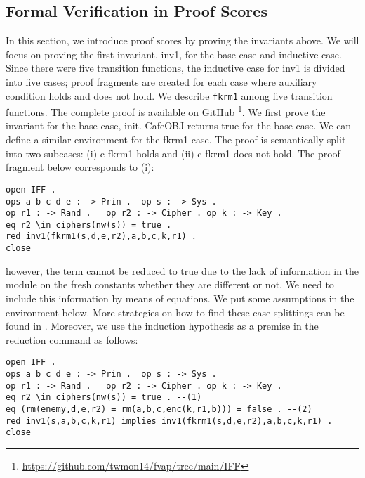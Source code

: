\documentclass[a4paper,fleqn]{cas-dc}
\begin{document}
\subsection{Formal Verification in Proof Scores} \label{pscores}
In this section, we introduce proof scores by proving the invariants above. We will focus on proving the first invariant, inv1, for the base case and inductive case. Since there were five transition functions, the inductive case for inv1 is divided into five cases; proof fragments are created for each case where auxiliary condition holds and does not hold. We describe \verb!fkrm1! among five transition functions. The complete proof is available on GitHub \footnote{\url{https://github.com/twmon14/fvap/tree/main/IFF}}. We first prove the invariant for the base case, init. 
CafeOBJ returns true for the base case. We can define a similar environment for the fkrm1 case. The proof is semantically split into two subcases: (i) c-fkrm1 holds and (ii) c-fkrm1 does not hold. The proof fragment below corresponds to (i): 
\begin{verbatim}
open IFF .
ops a b c d e : -> Prin .  op s : -> Sys .    
op r1 : -> Rand .   op r2 : -> Cipher . op k : -> Key .
eq r2 \in ciphers(nw(s)) = true .
red inv1(fkrm1(s,d,e,r2),a,b,c,k,r1) .
close
\end{verbatim}
however, the term cannot be reduced to true due to the lack of information in the module on the fresh constants whether they are different or not. We need to include this information by means of equations. We put some assumptions in the environment below. More strategies on how to find these case splittings can be found in \cite{OgataF03fmoods, Ogata2006, nakano2003}. Moreover, we use the induction hypothesis as a premise in the reduction command as follows:
\begin{small}
\begin{verbatim}
open IFF .
ops a b c d e : -> Prin .  op s : -> Sys .    
op r1 : -> Rand .   op r2 : -> Cipher . op k : -> Key .
eq r2 \in ciphers(nw(s)) = true . --(1)
eq (rm(enemy,d,e,r2) = rm(a,b,c,enc(k,r1,b))) = false . --(2)
red inv1(s,a,b,c,k,r1) implies inv1(fkrm1(s,d,e,r2),a,b,c,k,r1) .
close
\end{verbatim}
\end{small}
\end{document}
